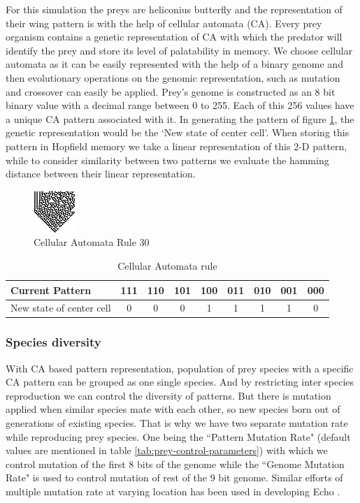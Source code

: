 \documentclass[letterpaper]{article}
\numberwithin{equation}{section}
\begin{document}
For this simulation the preys are heliconius butterfly and the representation of their wing pattern is with the help of cellular automata (CA). Every prey organism contains a genetic representation of CA with which the predator will identify the prey and store its level of palatability in memory. We choose cellular automata as it can be easily represented with the help of a binary genome and then evolutionary operations on the genomic representation, such as mutation and crossover can easily be applied. Prey's genome is constructed as an 8 bit binary value with a decimal range between 0 to 255. Each of this 256 values have a unique CA pattern associated with it. In generating the pattern of figure \ref{fig:cellular-automata-rule-30}, the genetic representation would be the `New state of center cell'. When storing this pattern in Hopfield memory we take a linear representation of this 2-D pattern, while to consider similarity between two patterns we evaluate the hamming distance between their linear representation. 

\begin{figure}[h!]
	\centering
	\includegraphics[scale=1]{images/CARule30}
	\caption[Cellular Automata]{Cellular Automata Rule 30}
	\label{fig:cellular-automata-rule-30}
\end{figure}

\begin{table}[h!]
	\small
	\centering
	\setlength\tabcolsep{2pt}
	\begin{tabular}{| p{3cm} | c | c | c | c | c | c | c | c |}
	  \hline
	  Current Pattern & 111 & 110 & 101 & 100 & 011 & 010 & 001 & 000 \\ \hline
	  New state of center cell & 0 & 0 & 0 & 1 & 1 & 1 & 1 & 0 \\
	  \hline
	\end{tabular}
	\caption{Cellular Automata rule}
	\label{tab:cellular-automata-rule}
\end{table} 

\subsubsection{Species diversity}
\label{subsubsec:species-diversity}
With CA based pattern representation, population of prey species with a specific CA pattern can be grouped as one single species. And by restricting inter species reproduction we can control the diversity of patterns. But there is mutation applied when similar species mate with each other, so new species born out of generations of existing species. That is why we have two separate mutation rate while reproducing prey species. One being the ``Pattern Mutation Rate" (default values are mentioned in table \ref{tab:prey-control-parameters}) with which we control mutation of the first 8 bits of the genome while the ``Genome Mutation Rate" is used to control mutation of rest of the 9 bit genome. Similar efforts of multiple mutation rate at varying location has been used in developing Echo \citep{hraber1997}.
\end{document}
